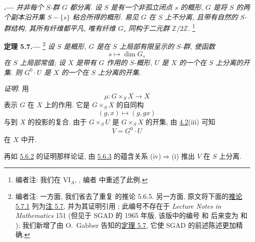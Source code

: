 
\medskip
{}\label{ctr:sga3-VIB-5.6.4}%
\noindent\textbf{.---}
\emph{并非每个 \(S\)-群 \(G\) 都分离.
设 \(S\) 是有一个非孤立闭点 \(s\) 的概形,
\(G\) 是将 \(S\) 的两个副本沿开集 \(S-\{s\}\) 粘合所得的概形.
易见 \(G\) 在 \(S\) 上不分离, 且带有自然的 \(S\)-群结构,
其所有纤维都平凡, 唯有纤维 \(G_s\) 同构于二元群
\(\mathbb Z/2\mathbb Z\).}%
\footnote{\label{note:sga3-VIB-45}编者注: 我们在
VI\(_A\), ,
编者 中重述了此例.}

\medskip
{}\label{thm:sga3-VIB-5.7}%
\noindent\textbf{定理 5.7.---}%
\footnote{\label{note:sga3-VIB-46}编者注: 一方面,
我们省去了重复  的推论 5.6.5.
另一方面, 原文将下面的\hyperref[cor:sga3-VIB-5.7.1]{推论 5.7.1}
列为\hyperref[cor:sga3-VIB-5.7.1]{注 5.7}, 并为其证明引用
; 此编号不存在于
\emph{Lecture Notes in Mathematics} 151
(但见于 SGAD 的 1965 年版, 该版中的编号
 和 
后来变为  和
);
我们新增了由 O.\ Gabber 告知的\hyperref[thm:sga3-VIB-5.7]{定理 5.7},
它使 SGAD 的前述陈述更加精确.}
\emph{设 \(S\) 是概形, \(G\) 是在 \(S\) 上局部有限呈示的 \(S\)-群,
使函数
\[
  s\longmapsto\dim G_s
\]
在 \(S\) 上局部常值; 设 \(X\) 是带有 \(G\) 作用的 \(S\)-概形,
\(U\) 是 \(X\) 的一个在 \(S\) 上分离的开集.
则 \(\underline{G^0}\mathbin{\cdot}U\) 是 \(X\)
的一个在 \(S\) 上分离的开集.}

\emph{证明.}
用
\[
  \mu:G\times_SX\longrightarrow X
\]
表示 \(G\) 在 \(X\) 上的作用.
它是 \(G\times_SX\) 的自同构
\[
  (g,x)\longmapsto(g,gx)
\]
与到 \(X\) 的投影的复合.
由于 \(G\times_SU\) 是 \(G\times_SX\) 的开集,
由 \hyperref[concl:sga3-VIB-4.2-iii]{4.2}\textup{(iii)} 可知
\[
  V=\underline{G^0}\mathbin{\cdot}U
\]
在 \(X\) 中开.

再如 \hyperref[cor:sga3-VIB-5.6.2]{5.6.2} 的证明那样论证,
由 \hyperref[lem:sga3-VIB-5.6.3]{5.6.3} 的蕴含关系
\textup{(iv)}\(\Rightarrow\)\textup{(i)} 推出 \(V\) 在 \(S\) 上分离.

